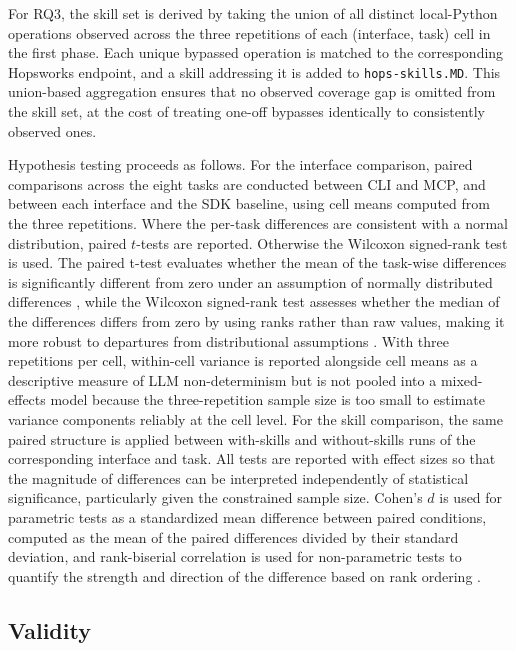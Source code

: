 \documentclass[
english,                 %
bibtex,                  %
includeExtraAbstracts, %
]{kththesis}
\numberwithin{listing}{chapter}
\begin{document}
For \gls{RQ}3, the skill set is derived by taking the union of all distinct local-Python operations observed across the three repetitions of each (interface, task) cell in the first phase. Each unique bypassed operation is matched to the corresponding Hopsworks endpoint, and a skill addressing it is added to \texttt{hops-skills.\gls{MD}}. This union-based aggregation ensures that no observed coverage gap is omitted from the skill set, at the cost of treating one-off bypasses identically to consistently observed ones.

Hypothesis testing proceeds as follows. For the interface comparison, paired comparisons across the eight tasks are conducted between \gls{CLI} and \gls{MCP}, and between each interface and the \gls{SDK} baseline, using cell means computed from the three repetitions. Where the per-task differences are consistent with a normal distribution, paired $t$-tests are reported. Otherwise the Wilcoxon signed-rank test is used. The paired t-test evaluates whether the mean of the task-wise differences is significantly different from zero under an assumption of normally distributed differences \cite{student_probable_1908}, while the Wilcoxon signed-rank test assesses whether the median of the differences differs from zero by using ranks rather than raw values, making it more robust to departures from distributional assumptions \cite{wilcoxon_individual_1945}. With three repetitions per cell, within-cell variance is reported alongside cell means as a descriptive measure of \gls{LLM} non-determinism but is not pooled into a mixed-effects model because the three-repetition sample size is too small to estimate variance components reliably at the cell level. For the skill comparison, the same paired structure is applied between with-skills and without-skills runs of the corresponding interface and task. All tests are reported with effect sizes so that the magnitude of differences can be interpreted independently of statistical significance, particularly given the constrained sample size. Cohen’s $d$ is used for parametric tests as a standardized mean difference between paired conditions, computed as the mean of the paired differences divided by their standard deviation, and rank-biserial correlation is used for non-parametric tests to quantify the strength and direction of the difference based on rank ordering \cite{cohen_statistical_2013}.

\subsection{Validity}
\end{document}
